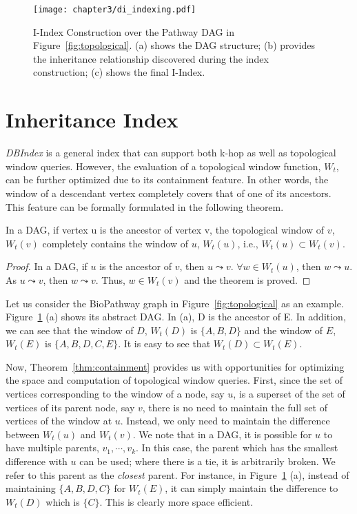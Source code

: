 \begin{figure}[t]
\centering
\texttt{[image: chapter3/di\_indexing.pdf]}
	\caption{I-Index Construction over the Pathway DAG in Figure~\ref{fig:topological}. (a) shows the DAG structure; (b) provides the inheritance relationship discovered during the index construction; (c) shows the final I-Index.}
	\label{fig:diff-index}
\end{figure}

\section{Inheritance Index}
\textit{DBIndex} is a general index that can support both k-hop as well as
topological window queries. 
However, the evaluation of a topological window function, $W_t$, 
can be further optimized due to its containment feature. 
In other words, the window of a descendant vertex 
completely covers that of one of its ancestors. 
This feature can be formally formulated in the following theorem. 

\begin{theorem}
\label{thm:containment}
In a DAG, if vertex u is the ancestor of vertex v, the topological window of $v$, $W_t(v)$ completely contains the window of $u$, $W_t(u)$, i.e., $W_t(u) \subset W_t(v)$.   
\end{theorem}

\begin{proof}
In a DAG, if $u$ is the ancestor of $v$, then $u \leadsto v$. $\forall w \in W_t(u)$, then $w \leadsto u$. As $u \leadsto v$, then $w \leadsto v$. Thus, $w \in W_t(v)$ and the theorem is proved.   
\end{proof}

Let us consider the BioPathway graph in Figure~\ref{fig:topological} as
an example.
Figure~\ref{fig:diff-index} (a) shows its abstract DAG. In (a), 
D is the ancestor of E. In addition, we can see that the window of $D$, 
$W_t(D)$ is $\{A, B, D\}$ and the window of $E$, $W_t(E)$ is $\{A, B, D, C, E\}$. It is easy to see that $W_t(D) \subset W_t(E)$. 

Now, Theorem~\ref{thm:containment} provides us with opportunities for optimizing
the space and computation of topological window queries. 
First, since the set of vertices corresponding to the
window of a node, say $u$, is a superset of the set of vertices of its
parent node, say $v$, there is no need to maintain the full set of 
vertices of the window at $u$. Instead, 
we only need to maintain the difference between 
$W_t(u)$ and $W_t(v)$. We note that in a DAG, it is possible for $u$ to have
multiple parents, $v_1, \cdots, v_k$. In this case, the parent
which has the smallest difference with $u$ can be used; where there
is a tie, it is arbitrarily broken.
We refer to this parent as the {\em closest} parent. For instance, in Figure~\ref{fig:diff-index} (a), instead of maintaining 
$\{A, B, D, C\}$ for $W_t(E)$, it can simply maintain the difference 
to $W_t(D)$ which is $\{C\}$. This is clearly more space efficient.

